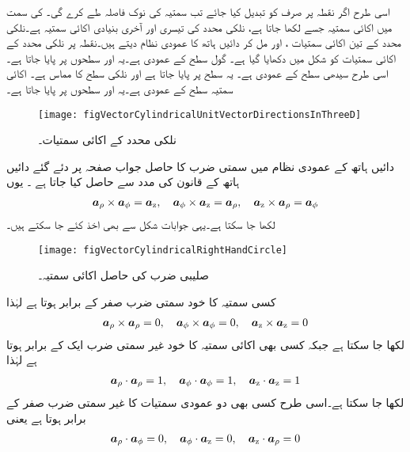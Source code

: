 اسی طرح اگر نقطہ  پر صرف  کو  تبدیل کیا جائے تب سمتیہ کی نوک  فاصلہ طے کرے گی۔  کی سمت میں اکائی سمتیہ جسے  لکھا جاتا ہے، نلکی محدد کی تیسری اور آخری بنیادی اکائی سمتیہ ہے۔نلکی محدد کے تین اکائی سمتیات ،  اور  مل کر دائیں ہاتھ کا عمودی  نظام دیتے ہیں۔نقطہ  پر نلکی محدد کے اکائی سمتیات کو شکل  میں دکھایا گیا ہے۔ گول سطح  کے عمودی ہے۔یہ  اور  سطحوں پر پایا جاتا ہے۔اسی طرح  سیدھی سطح   کے عمودی ہے۔ یہ  سطح پر پایا جاتا ہے اور  نلکی سطح کا مماس ہے۔ اکائی سمتیہ  سطح کے عمودی ہے۔یہ  اور  سطحوں پر پایا جاتا ہے۔
\begin{figure}
\centering
\texttt{[image: figVectorCylindricalUnitVectorDirectionsInThreeD]}
\caption{نلکی محدد کے اکائی سمتیات۔}
\label{شکل_سمتیہ_نلکی_اکائی_سمتیات_عمومی}
\end{figure}

دائیں ہاتھ کے عمودی نظام میں سمتی ضرب کا حاصل جواب صفحہ  پر دئے گئے دائیں ہاتھ کے قانون کی مدد سے حاصل کیا جاتا ہے ۔ یوں
\begin{align}
{\boldsymbol{a}}_{\rho} \times {\boldsymbol{a}}_{\phi}={\boldsymbol{a}}_{\textup{z}}, \quad {\boldsymbol{a}}_{\phi} \times {\boldsymbol{a}}_{\textup{z}}={\boldsymbol{a}}_{\rho}, \quad {\boldsymbol{a}}_{\textup{z}} \times {\boldsymbol{a}}_{\rho}={\boldsymbol{a}}_{\phi}
\end{align}
لکھا جا سکتا ہے۔یہی جوابات شکل  سے بھی اخذ کئے جا سکتے ہیں۔
\begin{figure}
\centering
\texttt{[image: figVectorCylindricalRightHandCircle]}
\caption{صلیبی ضرب کی حاصل اکائی سمتیہ۔}
\label{شکل_سمتیہ_نلکی_صلیبی_ضرب_مثبت_دائرہ}
\end{figure}

کسی سمتیہ کا خود سمتی ضرب صفر کے برابر ہوتا ہے لہٰذا
\begin{align}
{\boldsymbol{a}}_{\rho} \times {\boldsymbol{a}}_{\rho}=0, \quad {\boldsymbol{a}}_{\phi} \times {\boldsymbol{a}}_{\phi} =0, \quad {\boldsymbol{a}}_{\textup{z}} \times {\boldsymbol{a}}_{\textup{z}}=0
\end{align}
لکھا جا سکتا ہے جبکہ کسی بھی اکائی سمتیہ کا خود غیر سمتی ضرب ایک کے برابر ہوتا ہے لہٰذا
\begin{align}
{\boldsymbol{a}}_{\rho} \cdot {\boldsymbol{a}}_{\rho}=1, \quad {\boldsymbol{a}}_{\phi} \cdot {\boldsymbol{a}}_{\phi} =1, \quad {\boldsymbol{a}}_{\textup{z}} \cdot {\boldsymbol{a}}_{\textup{z}} =1
\end{align}
لکھا جا سکتا ہے۔اسی طرح کسی بھی دو عمودی سمتیات  کا غیر سمتی ضرب صفر کے برابر ہوتا ہے یعنی
\begin{align}
{\boldsymbol{a}}_{\rho} \cdot {\boldsymbol{a}}_{\phi}=0, \quad {\boldsymbol{a}}_{\phi} \cdot {\boldsymbol{a}}_{\textup{z}} =0, \quad {\boldsymbol{a}}_{\textup{z}} \cdot {\boldsymbol{a}}_{\rho} =0
\end{align}

